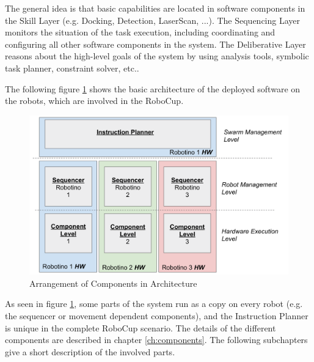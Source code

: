 The general idea is that basic capabilities are located in software components in the Skill Layer (e.g. Docking, Detection, LaserScan, ...). The Sequencing Layer monitors the situation of the task execution, including coordinating and configuring all other software components in the system. The Deliberative Layer reasons about the high-level goals of the system by using analysis tools, symbolic task planner, constraint solver, etc..

The following figure \ref{fig:architecture_overview} shows the basic architecture of the deployed software on the robots, which are involved in the RoboCup. \\

\begin{figure}[h]
\centering
\includegraphics[scale=0.23]{pic/architecture2018.png}
\caption{Arrangement of Components in Architecture}
\label{fig:architecture_overview}
\end{figure}

As seen in figure \ref{fig:architecture_overview}, some parts of the system run as a copy on every robot (e.g. the sequencer or movement dependent components), and the Instruction Planner is unique in the complete RoboCup scenario. The details of the different components are described in chapter \ref{ch:components}. The following subchapters give a short description of the involved parts.

